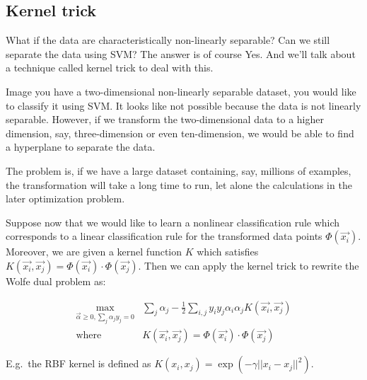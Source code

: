 \documentclass{article}
\begin{document}
\subsection{Kernel trick}
What if the data are characteristically non-linearly separable? Can we still separate the data using SVM? The answer is of course Yes. And we’ll talk about a technique called kernel trick to deal with this.

Image you have a two-dimensional non-linearly separable dataset, you would like to classify it using SVM. It looks like not possible because the data is not linearly separable. However, if we transform the two-dimensional data to a higher dimension, say, three-dimension or even ten-dimension, we would be able to find a hyperplane to separate the data.

The problem is, if we have a large dataset containing, say, millions of examples, the transformation will take a long time to run, let alone the calculations in the later optimization problem.


Suppose now that we would like to learn a nonlinear classification rule which corresponds to a linear classification rule for the transformed data points $\Phi (\vec{x_i})$. Moreover, we are given a kernel function $K$ which satisfies $K(\vec{x_i}, \vec{x_j}) = \Phi (\vec{x_i}) \cdot \Phi (\vec{x_j})$. Then we can apply the kernel trick to rewrite the Wolfe dual problem as:

\begin{align*}
\max_{\vec{\alpha}\geq0, \sum_j \alpha_j y_j = 0} & \sum_j \alpha_j - \frac{1}{2} \sum_{i,j} y_iy_j\alpha_i\alpha_j K(\vec{x_i}, \vec{x_j}) \\
\mathrm{where} \quad & K(\vec{x_i}, \vec{x_j}) = \Phi (\vec{x_i}) \cdot \Phi (\vec{x_j})
\end{align*}


E.g.\, the RBF kernel is defined as $K(x_i,x_j)= \exp (- \gamma || x_i - x_j ||^2)$.
\end{document}
